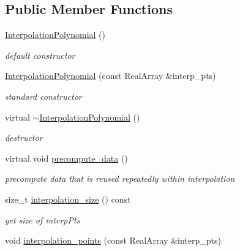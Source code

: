 \subsection*{Public Member Functions}
\begin{DoxyCompactItemize}
\item 
\hyperlink{classPecos_1_1InterpolationPolynomial_a600a8ab653342299615a8c494aa33a5c}{Interpolation\+Polynomial} ()\label{classPecos_1_1InterpolationPolynomial_a600a8ab653342299615a8c494aa33a5c}

\begin{DoxyCompactList}\small\item\em default constructor \end{DoxyCompactList}\item 
\hyperlink{classPecos_1_1InterpolationPolynomial_a032b69c7d11f948db8cdef4e44d81f25}{Interpolation\+Polynomial} (const Real\+Array \&interp\+\_\+pts)\label{classPecos_1_1InterpolationPolynomial_a032b69c7d11f948db8cdef4e44d81f25}

\begin{DoxyCompactList}\small\item\em standard constructor \end{DoxyCompactList}\item 
virtual \hyperlink{classPecos_1_1InterpolationPolynomial_a3fc5373ce7b55a154e2b21ea7a75098b}{$\sim$\+Interpolation\+Polynomial} ()\label{classPecos_1_1InterpolationPolynomial_a3fc5373ce7b55a154e2b21ea7a75098b}

\begin{DoxyCompactList}\small\item\em destructor \end{DoxyCompactList}\item 
virtual void \hyperlink{classPecos_1_1InterpolationPolynomial_a9a5fd3dc945d15c8423dc66dcd137b4f}{precompute\+\_\+data} ()\label{classPecos_1_1InterpolationPolynomial_a9a5fd3dc945d15c8423dc66dcd137b4f}

\begin{DoxyCompactList}\small\item\em precompute data that is reused repeatedly within interpolation \end{DoxyCompactList}\item 
size\+\_\+t \hyperlink{classPecos_1_1InterpolationPolynomial_a3122d8fb10bc54de12fde87cffdf8fee}{interpolation\+\_\+size} () const \label{classPecos_1_1InterpolationPolynomial_a3122d8fb10bc54de12fde87cffdf8fee}

\begin{DoxyCompactList}\small\item\em get size of interp\+Pts \end{DoxyCompactList}\item 
void \hyperlink{classPecos_1_1InterpolationPolynomial_a6babe691e74f48a1b3597132cc739223}{interpolation\+\_\+points} (const Real\+Array \&interp\+\_\+pts)\label{classPecos_1_1InterpolationPolynomial_a6babe691e74f48a1b3597132cc739223}


\end{DoxyCompactItemize}
